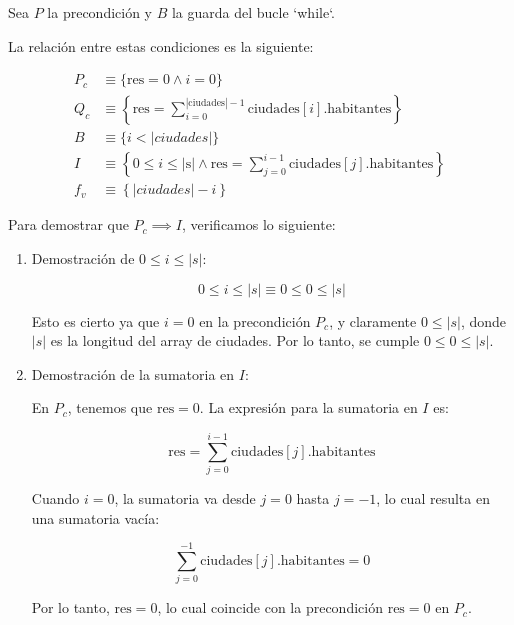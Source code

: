 \documentclass[10pt,a4paper]{article}
\begin{document}
Sea \( P \) la precondición y \( B \) la guarda del bucle `while`.

La relación entre estas condiciones es la siguiente:

\begin{align*}
	P_c & \equiv \{ \text{res} = 0 \land i = 0 \}                                                                                   \\
	Q_c & \equiv \left\{ \text{res} = \sum_{i=0}^{|\text{ciudades}|-1} \text{ciudades}[i].\text{habitantes} \right\}                \\
	B   & \equiv \{ i < |ciudades| \}                                                                                               \\
	I   & \equiv \left\{ 0 \leq i \leq |\text{s}| \land \text{res} = \sum_{j=0}^{i-1} \text{ciudades}[j].\text{habitantes} \right\} \\
	f_v & \equiv \left\{ |ciudades| - i \right\}
\end{align*}

Para demostrar que \( P_c \implies I \), verificamos lo siguiente:

\begin{enumerate}
	\item Demostración de \( 0 \leq i \leq |s| \):

	      \[
		      0 \leq i \leq |s| \equiv 0 \leq 0 \leq |s|
	      \]

	      Esto es cierto ya que \( i = 0 \) en la precondición \( P_c \), y claramente \( 0 \leq |s| \), donde \( |s| \) es la longitud del array de ciudades. Por lo tanto, se cumple \( 0 \leq 0 \leq |s| \).

	\item Demostración de la sumatoria en \( I \):

	      En \( P_c \), tenemos que \( \text{res} = 0 \). La expresión para la sumatoria en \( I \) es:

	      \[
		      \text{res} = \sum_{j=0}^{i-1} \text{ciudades}[j].\text{habitantes}
	      \]

	      Cuando \( i = 0 \), la sumatoria va desde \( j = 0 \) hasta \( j = -1 \), lo cual resulta en una sumatoria vacía:

	      \[
		      \sum_{j=0}^{-1} \text{ciudades}[j].\text{habitantes} = 0
	      \]

	      Por lo tanto, \( \text{res} = 0 \), lo cual coincide con la precondición \( \text{res} = 0 \) en \( P_c \).
\end{enumerate}
\end{document}
